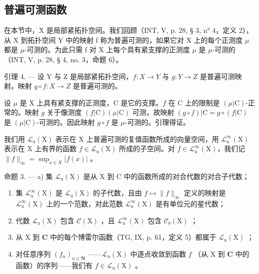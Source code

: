 \subsection{普遍可测函数}

在本节中，X 是局部紧拓扑空间。我们回顾（INT, V, p. 28, § 3, n° 4，定义 2），从 X 到拓扑空间 Y 中的映射 f 称为普遍可测的，如果它对 X 上的每个正测度 \(\mu\) 都是 \(\mu\)-可测的。为此只需 f 对 X 上每个具有紧支撑的正测度 \(\mu\) 是 \(\mu\)-可测的（INT, V, p. 28, § 4, no. 3，命题 6）。

引理 4. --- 设 Y 与 Z 是局部紧拓扑空间，\(f\colon X\to Y\) 与 \(g\colon Y\to Z\) 是普遍可测映射。映射 \(g\circ f\colon X\to Z\) 是普遍可测的。

设 \(\mu\) 是 X 上具有紧支撑的正测度，C 是它的支撑。\(f\) 在 C 上的限制是 \((\mu|\mathrm{C})\)-正常的。映射 \(g\) 关于像测度 \((f|\mathrm{C})(\mu|\mathrm{C})\) 可测，故映射 \((g \circ f)|\mathrm{C} = g \circ (f|\mathrm{C})\) 是 \((\mu|\mathrm{C})\)-可测的。因此映射 \(g \circ f\) 是 \(\mu\)-可测的。引理得证。

我们用 \(\mathcal{L}_{\mathrm{u}}(\mathrm{X})\) 表示在 X 上普遍可测的复值函数所成的向量空间，用 \(\mathcal{L}_{\mathrm{u}}^{\infty}(\mathrm{X})\) 表示在 X 上有界的函数 \(f \in \mathcal{L}_{\mathrm{u}}(\mathrm{X})\) 所成的子空间。对 \(f \in \mathcal{L}_{\mathrm{u}}^{\infty}(\mathrm{X})\)，我们记 \(\|f\|_{\infty} = \sup_{x \in X} |f(x)|\) 。

命题 3. --- a) 集 \(\mathcal{L}_{\mathrm{u}}(\mathrm{X})\) 是从 X 到 C 中的函数所成的对合代数的对合子代数；

\begin{enumerate}
\def\labelenumi{\alph{enumi})}
\setcounter{enumi}{1}
\item
  集 \(\mathcal{L}_{\mathrm{u}}^{\infty}(\mathrm{X})\) 是 \(\mathcal{L}_{\mathrm{u}}(\mathrm{X})\) 的子代数，且由 \(f\mapsto \| f\|_{\infty}\) 定义的映射是 \(\mathcal{L}_{\mathrm{u}}^{\infty}(\mathrm{X})\) 上的一个范数，对此范数 \(\mathcal{L}_{\mathrm{u}}^{\infty}(\mathrm{X})\) 是有单位元的星代数；
\item
  代数 \(\mathcal{L}_{\mathrm{u}}(\mathrm{X})\) 包含 \(\mathcal{C}(\mathrm{X})\) ，且 \(\mathcal{L}_{\mathrm{u}}^{\infty}(\mathrm{X})\) 包含 \(\mathcal{C}_b(\mathrm{X})\) ；
\item
  从 X 到 \(\mathbf{C}\) 中的每个博雷尔函数（TG, IX, p. 61，定义 5）都属于 \(\mathcal{L}_{\mathrm{u}}(\mathrm{X})\) ；
\item
  对任意序列 \((f_n)_{n\in \mathbf{N}}\) ——\(\mathcal{L}_{\mathrm{u}}(\mathrm{X})\) 中逐点收敛到函数 \(f\) （从 X 到 \(\mathbf{C}\) 中的函数）的序列——我们有 \(f\in \mathcal{L}_{\mathrm{u}}(\mathrm{X})\) 。
\end{enumerate}


